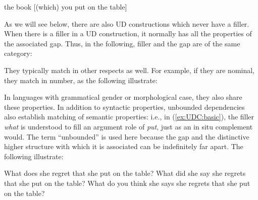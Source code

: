 \documentclass[output=paper
	        ,collection
	        ,collectionchapter
 	        ,biblatex
                ,babelshorthands
                ,newtxmath
                ,draftmode
                ,colorlinks, citecolor=brown
]{langscibook}
\begin{document}
{  \begin{exe} \ex \label{ex:UDC:2} the book {[}(which) you put
    \trace{} on the table{]} \end{exe} \noindent As we will see below,
  there are also UD constructions which never have a filler.  When
  there is a filler in a UD construction, it normally has all the
  properties of the associated gap. Thus, in the following, filler and
  the gap are of the same category:

  \begin{exe}
    \ex \begin{xlist} \label{ex:UDC:3}   
          \end{xlist} \end{exe} \noindent They typically match
  in other respects as well. For example, if they are nominal, they
  match in number, as the following illustrate:

  \begin{exe}
    \ex \begin{xlist} \label{ex:UDC:4} 
        \end{xlist} \end{exe}

  \noindent In languages with
  grammatical gender or morphological case, they also share these
  properties.  In addition to syntactic properties, unbounded
  dependencies also establish matching of semantic properties: i.e.,
  in (\ref{ex:UDC:basic}), the filler \textit{what} is understood to
  fill an argument role of \textit{put}, just as an in situ complement
  would.  The term ``unbounded'' is used here because the gap and the
  distinctive higher structure with which it is associated can be
  indefinitely far apart. The following illustrate:

  \begin{exe}
    \ex \begin{xlist} \label{ex:UDC:5} \ex What does she regret that
      she put \trace{} on the table?  \ex What did she say she regrets
      that she put \trace{} on the table?  \ex What do you think she
      says she regrets that she put \trace{} on the
      table?  \end{xlist} \end{exe}

}
\end{document}
